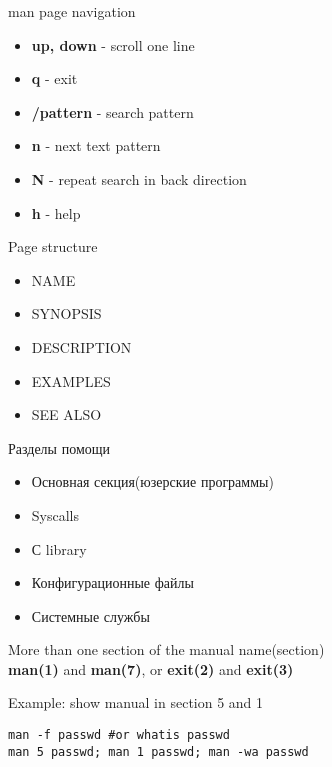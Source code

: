 \begin{frame}[fragile]{man page navigation}
		\begin{itemize}
			\item \textbf{up, down} - scroll one line
			\item \textbf{q} - exit
			\item \textbf{/pattern} - search pattern
			\item \textbf{n} - next text pattern
			\item \textbf{N} - repeat search in back direction
			\item \textbf{h} - help
		\end{itemize}
\end{frame}

\begin{frame}[fragile]{Page structure}
		\begin{itemize}
			\item NAME
			\item SYNOPSIS
			\item DESCRIPTION
			\item EXAMPLES
			\item SEE ALSO
		\end{itemize}
\end{frame}

\begin{frame}[fragile]{Разделы помощи}
	\begin{itemize}
		\item[1] Основная секция(юзерские программы)
		\item[2] Syscalls
		\item[3] С library
		\item[5] Конфигурационные файлы
		\item[8] Системные службы
	\end{itemize}
\end{frame}

\begin{frame}[fragile]{More than one section of the manual}
	name(section)  \\ 
	\textbf{man(1)} and \textbf{man(7)}, or \textbf{exit(2)} and \textbf{exit(3)} \\
     \begin{block}{Example: show manual in section 5 and 1}
        \begin{lstlisting}
man -f passwd #or whatis passwd 
man 5 passwd; man 1 passwd; man -wa passwd
        \end{lstlisting}
    \end{block}
\end{frame}

